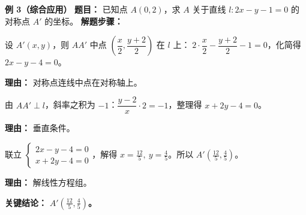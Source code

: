 \begin{examplebox}
	\medskip
	\textbf{\textcolor{CExample}{例 3（综合应用）}}
	\textbf{\textcolor{CExample}{题目：}}
	已知点 $A(0,2)$，求 $A$ 关于直线 $l: 2x-y-1=0$ 的对称点 $A'$ 的坐标。
	\textbf{\textcolor{CExample}{解题步骤：}}
	\begin{description}[style=nextline, leftmargin=2.8em, labelsep=0.5em, itemsep=0.45em]
		\item[\textbf{第一步（设点列中点方程）}]
			设 $A'(x,y)$，则 $AA'$ 中点 $\left(\dfrac{x}{2},\dfrac{y+2}{2}\right)$ 在 $l$ 上：$\;2\cdot\dfrac{x}{2} - \dfrac{y+2}{2} -1 = 0$，化简得 $2x - y - 4 = 0$。
			\par\textbf{理由：} 对称点连线中点在对称轴上。
		\item[\textbf{第二步（列垂直方程）}]
			由 $AA'\perp l$，斜率之积为 $-1$：$\dfrac{y-2}{x}\cdot 2 = -1$，整理得 $x+2y-4=0$。
			\par\textbf{理由：} 垂直条件。
		\item[\textbf{第三步（解方程组得坐标）}]
			联立 $
			\begin{cases}
				2x - y -4 =0 \\ x+2y-4 =0
		\end{cases}
			$，解得 $x=\frac{12}{5},\ y=\frac{4}{5}$。所以 $A'(\frac{12}{5},\frac{4}{5})$。
			\par\textbf{理由：} 解线性方程组。
	\end{description}
	\textbf{\textcolor{CExample}{关键结论：}}
	\textbf{ $A'(\frac{12}{5},\frac{4}{5})$。}
\end{examplebox}
